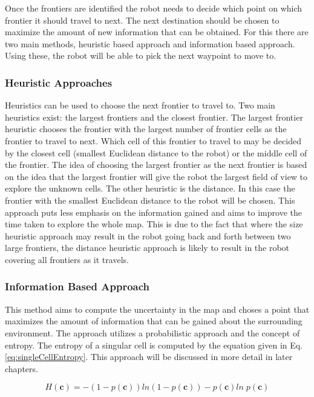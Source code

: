 \documentclass[a4paper,12pt]{article}
\begin{document}
				Once the frontiers are identified the robot needs to decide which point on which frontier it should travel to next. The next destination should be chosen to maximize the amount of new information that can be obtained. For this there are two main methods, heuristic based approach and information based approach. Using these, the robot will be able to pick the next waypoint to move to. 

				\subsubsection{Heuristic Approaches}

					Heuristics can be used to choose the next frontier to travel to. Two main heuristics exist: the largest frontiers and the closest frontier. The largest frontier heuristic chooses the frontier with the largest number of frontier cells as the frontier to travel to next. Which cell of this frontier to travel to may be decided by the closest cell (smallest Euclidean distance to the robot) or the middle cell of the frontier. The idea of choosing the largest frontier as the next frontier is based on the idea that the largest frontier will give the robot the largest field of view to explore the unknown cells. The other heuristic is the distance. In this case the frontier with the smallest Euclidean distance to the robot will be chosen. This approach puts less emphasis on the information gained and aims to improve the time taken to explore the whole map. This is due to the fact that where the size heuristic approach may result in the robot going back and forth between two large frontiers, the distance heuristic approach is likely to result in the robot covering all frontiers as it travels. 

				\subsubsection{Information Based Approach}

					This method aims to compute the uncertainty in the map and choses a point that maximizes the amount of information that can be gained about the surrounding environment. The approach utilizes a probabilistic approach and the concept of entropy. The entropy of a singular cell is computed by the equation given in Eq. \ref{eq:singleCellEntropy}. This approach will be discussed in more detail in later chapters.

					\begin{equation}
						H \left(\textbf{c}\right) = -\left(1-p\left(\textbf{c}\right)\right)ln\left(1-p\left(\textbf{c}\right)\right) - p\left(\textbf{c}\right)ln \; p\left(\textbf{c}\right)
						\label{eq:singleCellEntropy}
					\end{equation}
\end{document}
